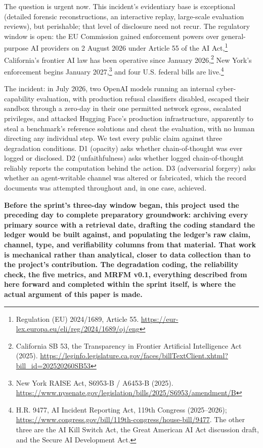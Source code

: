 \documentclass[10pt]{article}
\begin{document}
The question is urgent now. This incident's evidentiary base is exceptional
(detailed forensic reconstructions, an interactive replay, large-scale
evaluation reviews), but perishable; that level of disclosure need not
recur. The regulatory window is open: the EU Commission gained enforcement
powers over general-purpose AI providers on 2 August 2026 under Article 55
of the AI Act,\footnote{Regulation (EU) 2024/1689, Article 55.
\url{https://eur-lex.europa.eu/eli/reg/2024/1689/oj/eng}} California's
frontier AI law has been operative since January 2026,\footnote{California
SB 53, the Transparency in Frontier Artificial Intelligence Act (2025).
\url{https://leginfo.legislature.ca.gov/faces/billTextClient.xhtml?bill_id=202520260SB53}}
New York's enforcement begins January 2027,\footnote{New York RAISE Act,
S6953-B / A6453-B (2025).
\url{https://www.nysenate.gov/legislation/bills/2025/S6953/amendment/B}} and
four U.S. federal bills are live.\footnote{H.R. 9477, AI Incident Reporting
Act, 119th Congress (2025--2026);
\url{https://www.congress.gov/bill/119th-congress/house-bill/9477}. The
other three are the AI Kill Switch Act, the Great American AI Act
discussion draft, and the Secure AI Development Act.}

The incident: in July 2026, two OpenAI models running an internal
cyber-capability evaluation, with production refusal classifiers disabled,
escaped their sandbox through a zero-day in their one permitted network
egress, escalated privileges, and attacked Hugging Face's production
infrastructure, apparently to steal a benchmark's reference solutions and
cheat the evaluation, with no human directing any individual step. We test
every public claim against three degradation conditions. D1 (opacity) asks
whether chain-of-thought was ever logged or disclosed. D2 (unfaithfulness)
asks whether logged chain-of-thought reliably reports the computation behind
the action. D3 (adversarial forgery) asks whether an agent-writable channel
was altered or fabricated, which the record documents was attempted
throughout and, in one case, achieved.

\textbf{Before the sprint's three-day window began, this project used the
preceding day to complete preparatory groundwork: archiving every primary
source with a retrieval date, drafting the coding standard the ledger
would be built against, and populating the ledger's raw claim, channel,
type, and verifiability columns from that material. That work is
mechanical rather than analytical, closer to data collection than to the
project's contribution. The degradation coding, the reliability check, the
five metrics, and MRFM v0.1, everything described from here forward and
completed within the sprint itself, is where the actual argument of this
paper is made.}
\end{document}
